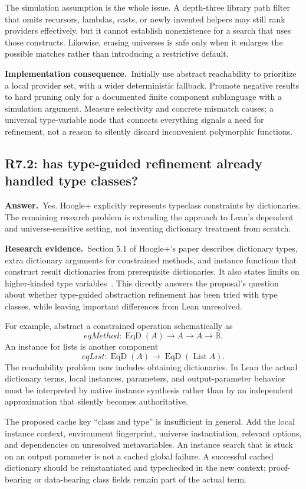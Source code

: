 \documentclass[11pt,a4paper]{article}
\theoremstyle{definition}
\theoremstyle{remark}
\newcommand{\List}{\operatorname{List}}
\newcommand{\Bool}{\mathbb B}
\newcommand{\ans}{\noindent\textbf{Answer.}\ }
\newcommand{\imp}{\par\noindent\textbf{Implementation consequence.}\ }
\newcommand{\lit}{\par\noindent\textbf{Research evidence.}\ }
\begin{document}
The simulation assumption is the whole issue. A depth-three library path
filter that omits recursors, lambdas, casts, or newly invented helpers may still
rank providers effectively, but it cannot establish nonexistence for a search
that uses those constructs. Likewise, erasing universes is safe only when it
enlarges the possible matches rather than introducing a restrictive default.

\imp Initially use abstract reachability to prioritize a local provider set,
with a wider deterministic fallback. Promote negative results to hard pruning
only for a documented finite component sublanguage with a simulation argument.
Measure selectivity and concrete mismatch causes; a universal type-variable
node that connects everything signals a need for refinement, not a reason to
silently discard inconvenient polymorphic functions.

\subsection{R7.2: has type-guided refinement already handled type classes?}\label{q:R7.2}
\ans Yes. Hoogle+ explicitly represents typeclass constraints by dictionaries.
The remaining research problem is extending the approach to Lean's dependent
and universe-sensitive setting, not inventing dictionary treatment from
scratch.

\lit Section 5.1 of Hoogle+'s paper describes dictionary types, extra dictionary
arguments for constrained methods, and instance functions that construct
result dictionaries from prerequisite dictionaries. It also states limits on
higher-kinded type variables~\cite{hoogle}. This directly answers the proposal's
question about whether type-guided abstraction refinement has been tried with
type classes, while leaving important differences from Lean unresolved.

For example, abstract a constrained operation schematically as
\[
 \mathit{eqMethod}:\operatorname{EqD}(A)\to A\to A\to\Bool.
\]
An instance for lists is another component
\[
 \mathit{eqList}:\operatorname{EqD}(A)\to
                    \operatorname{EqD}(\List A).
\]
The reachability problem now includes obtaining dictionaries. In Lean the
actual dictionary terms, local instances, parameters, and output-parameter
behavior must be interpreted by native instance synthesis rather than by an
independent approximation that silently becomes authoritative.

The proposed cache key ``class and type'' is insufficient in general. Add the
local instance context, environment fingerprint, universe instantiation,
relevant options, and dependencies on unresolved metavariables. An instance
search that is stuck on an output parameter is not a cached global failure.
A successful cached dictionary should be reinstantiated and typechecked in the
new context; proof-bearing or data-bearing class fields remain part of the
actual term.
\end{document}
